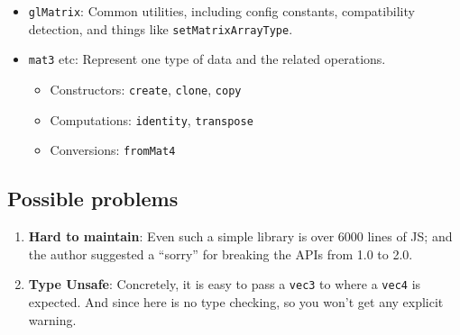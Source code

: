 \begin{itemize}
\tightlist
\item
  \texttt{glMatrix}: Common utilities, including config constants,
  compatibility detection, and things like \texttt{setMatrixArrayType}.
\item
  \texttt{mat3} etc: Represent one type of data and the related
  operations.

  \begin{itemize}
  \tightlist
  \item
    Constructors: \texttt{create}, \texttt{clone}, \texttt{copy}
  \item
    Computations: \texttt{identity}, \texttt{transpose}
  \item
    Conversions: \texttt{fromMat4}
  \end{itemize}
\end{itemize}

\subsection{Possible problems}\label{possible-problems}

\begin{enumerate}
\def\labelenumi{\arabic{enumi}.}
\tightlist
\item
  \textbf{Hard to maintain}: Even such a simple library is over 6000
  lines of JS; and the author suggested a ``sorry'' for breaking the
  APIs from 1.0 to 2.0.
\item
  \textbf{Type Unsafe}: Concretely, it is easy to pass a \texttt{vec3}
  to where a \texttt{vec4} is expected. And since here is no type
  checking, so you won't get any explicit warning.
\end{enumerate}
